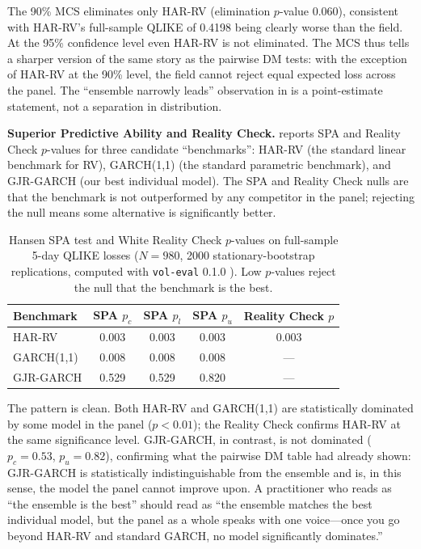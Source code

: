 The 90\% MCS eliminates only HAR-RV (elimination $p$-value 0.060), consistent with HAR-RV's full-sample QLIKE of 0.4198 being clearly worse than the field. At the 95\% confidence level even HAR-RV is not eliminated. The MCS thus tells a sharper version of the same story as the pairwise DM tests: with the exception of HAR-RV at the 90\% level, the field cannot reject equal expected loss across the panel. The ``ensemble narrowly leads'' observation in  is a point-estimate statement, not a separation in distribution.

\textbf{Superior Predictive Ability and Reality Check.}  reports SPA \citep{Hansen2005} and Reality Check \citep{White2000} $p$-values for three candidate ``benchmarks'': HAR-RV (the standard linear benchmark for RV), GARCH(1,1) (the standard parametric benchmark), and GJR-GARCH (our best individual model). The SPA and Reality Check nulls are that the benchmark is not outperformed by any competitor in the panel; rejecting the null means some alternative is significantly better.

\begin{table}[H]
\centering
\small
\caption{Hansen SPA test \citep{Hansen2005} and White Reality Check \citep{White2000} $p$-values on full-sample 5-day QLIKE losses ($N=980$, 2000 stationary-bootstrap replications, computed with \texttt{vol-eval} 0.1.0 \citep{Khan2026VolEval}). Low $p$-values reject the null that the benchmark is the best.}
\label{tab:spa_results}
\begin{tabular}{l c c c c}
\toprule
\textbf{Benchmark} & \textbf{SPA $p_c$} & \textbf{SPA $p_l$} & \textbf{SPA $p_u$} & \textbf{Reality Check $p$} \\
\midrule
HAR-RV     & 0.003 & 0.003 & 0.003 & 0.003 \\
GARCH(1,1) & 0.008 & 0.008 & 0.008 & --- \\
GJR-GARCH  & 0.529 & 0.529 & 0.820 & --- \\
\bottomrule
\end{tabular}
\end{table}

The pattern is clean. Both HAR-RV and GARCH(1,1) are statistically dominated by some model in the panel ($p < 0.01$); the Reality Check confirms HAR-RV at the same significance level. GJR-GARCH, in contrast, is not dominated ($p_c = 0.53$, $p_u = 0.82$), confirming what the pairwise DM table had already shown: GJR-GARCH is statistically indistinguishable from the ensemble and is, in this sense, the model the panel cannot improve upon. A practitioner who reads  as ``the ensemble is the best'' should read  as ``the ensemble matches the best individual model, but the panel as a whole speaks with one voice---once you go beyond HAR-RV and standard GARCH, no model significantly dominates.''

